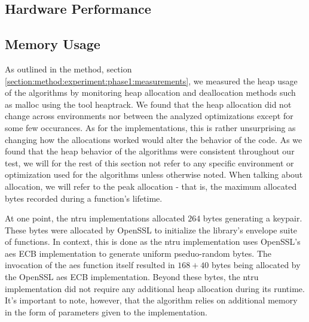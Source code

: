 
\subsection{Hardware Performance}



\subsection{Memory Usage}

As outlined in the method, section \ref{section:method:experiment:phase1:measurements}, we measured the heap usage of the algorithms by monitoring heap allocation and deallocation methods such as malloc using the tool heaptrack. We found that the heap allocation did not change across environments nor between the analyzed optimizations except for some few occurances. As for the implementations, this is rather unsurprising as changing how the allocations worked would alter the behavior of the code. As we found that the heap behavior of the algorithms were consistent throughout our test, we will for the rest of this section not refer to any specific environment or optimization used for the algorithms unless otherwise noted. When talking about allocation, we will refer to the peak allocation - that is, the maximum allocated bytes recorded during a function's lifetime.

At one point, the \gls{ntru} implementations allocated $264$ bytes generating a keypair. These bytes were allocated by OpenSSL to initialize the library's envelope suite of functions. In context, this is done as the \gls{ntru} implementation uses OpenSSL's \gls{aes} ECB implementation to generate uniform pseduo-random bytes. The invocation of the \gls{aes} function itself resulted in $168 + 40$ bytes being allocated by the OpenSSL \gls{aes} ECB implementation. Beyond these bytes, the \gls{ntru} implementation did not require any additional heap allocation during its runtime. It's important to note, however, that the algorithm relies on additional memory in the form of parameters given to the implementation.

